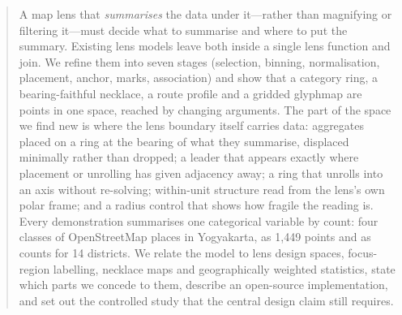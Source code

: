 \begin{abstract}
A map lens that \emph{summarises} the data under it---rather than magnifying or
filtering it---must decide what to summarise and where to put the summary.
Existing lens models leave both inside a single lens function and join. We
refine them into seven stages (selection, binning, normalisation, placement,
anchor, marks, association) and show that a category ring, a bearing-faithful
necklace, a route profile and a gridded glyphmap are points in one space,
reached by changing arguments. The part of the space we find new is where the
lens boundary itself carries data: aggregates placed on a ring at the bearing of
what they summarise, displaced minimally rather than dropped; a leader that
appears exactly where placement or unrolling has given adjacency away; a ring
that unrolls into an axis without re-solving; within-unit structure read from
the lens's own polar frame; and a radius control that shows how fragile the
reading is. Every demonstration summarises one categorical variable by count:
four classes of OpenStreetMap places in Yogyakarta, as 1{,}449 points and as
counts for 14 districts. We relate the model to lens design spaces, focus-region labelling,
necklace maps and geographically weighted statistics, state which parts we
concede to them, describe an open-source implementation, and set out the
controlled study that the central design claim still requires.
\end{abstract}
